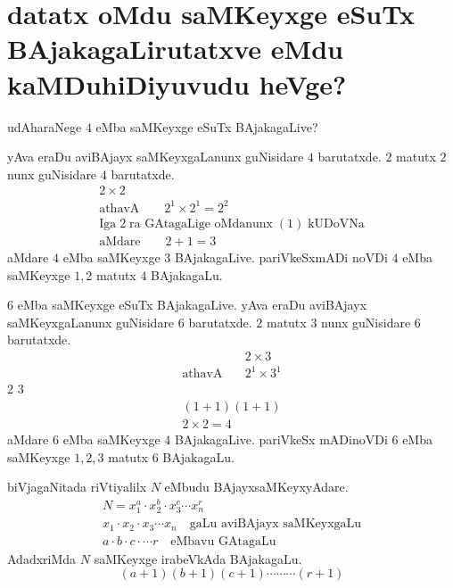 \chapter{{\bf datatx oMdu saMKeyxge eSuTx BAjakagaLirutatxve eMdu kaMDuhiDiyuvudu heVge?}}


udAharaNege  $4$ eMba saMKeyxge eSuTx BAjakagaLive?

yAva eraDu aviBAjayx saMKeyxgaLanunx guNisidare $4$ barutatxde. $2$ matutx $2$ nunx guNisidare $4$ barutatxde.
\begin{gather*}
2\times 2\\
\text{athavA} \qquad 2^1\times 2^1 = 2^2\\
\text{Iga}\; 2 \;\text{ra GAtagaLige oMdanunx} \;(1)\; \text{kUDoVNa}\\
\text{aMdare}\qquad 2+1 =3
\end{gather*}
aMdare $4$ eMba saMKeyxge $3$ BAjakagaLive. pariVkeSxmADi noVDi $4$ eMba saMKeyxge $1,2$ matutx $4$ BAjakagaLu. 


$6$ eMba saMKeyxge eSuTx BAjakagaLive. yAva eraDu aviBAjayx saMKeyxgaLanunx guNisidare $6$ barutatxde.
$2$ matutx $3$ nunx guNisidare $6$ barutatxde.
\begin{align*}
                &2 \times 3\\[-3pt]
\text{athavA}\quad &2^1 \times 3^1
\end{align*}
 \;$2$\;  \;$3$\; 
\begin{gather*}
(1+1)(1+1)\\
2\times 2 =4 
\end{gather*}
aMdare $6$ eMba saMKeyxge $4$ BAjakagaLive. pariVkeSx mADinoVDi $6$ eMba saMKeyxge $1,2,3$ matutx $6$ BAjakagaLu.

biVjagaNitada riVtiyalilx $N$ eMbudu BAjayxsaMKeyxyAdare.
\begin{gather*}
N=x_1^a \cdot x_2^b\cdot x_3^c \cdots x_n^r\\
x_1\cdot x_2\cdot x_3 \cdots x_n \quad\text{gaLu aviBAjayx saMKeyxgaLu}\\
a \cdot b\cdot c\cdot \cdots r \quad\text{eMbavu GAtagaLu}
\end{gather*}
AdadxriMda $N$ saMKeyxge irabeVkAda BAjakagaLu.
$$
(a+1)(b+1)(c+1)\cdots\cdots\cdots(r+1)
$$
